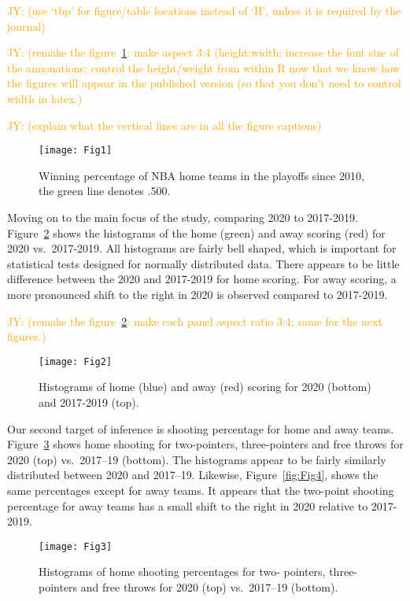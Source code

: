 \documentclass[10pt]{article}
\newcommand{\jy}[1]{\textcolor{orange}{JY: (#1)}}
\begin{document}
\jy{use `tbp' for figure/table locations instead of `H', unless it is
  required by the journal}

\jy{remake the figure~\ref{fig:Fig1}: make aspect 3:4 (height:width;
  increase the font size of the annonations; control the height/weight
  from within R now that we know how the figures will appear in the
  published version (so that you don't need to control width in latex.}

\jy{explain what the vertical lines are in all the figure captions}

\begin{figure}[tbp]
  \centering
  \texttt{[image: Fig1]}
  \caption{Winning percentage of NBA home teams in the playoffs since
    2010, the green line denotes .500.}
  \label{fig:Fig1}
\end{figure}

Moving on to the main focus of the study, comparing 2020 to 2017-2019.
Figure~\ref{fig:Fig2} shows the histograms of the home (green) and
away scoring (red) for 2020 vs.~2017-2019. All histograms are
fairly bell shaped, which is important for statistical tests
designed for normally distributed data. There appears to be little
difference between the 2020 and 2017-2019 for home scoring. For
away scoring, a more pronounced shift to the right in 2020 is observed
compared to 2017-2019.


\jy{remake the figure~\ref{fig:Fig2}: make each panel aspect ratio 3:4; same for the
  next figures.}

\begin{figure}[H]
  \centering
  \texttt{[image: Fig2]}
  \caption{Histograms of home (blue) and away (red) scoring
    for 2020 (bottom) and 2017-2019 (top).}
  \label{fig:Fig2}
\end{figure}

Our second target of inference is shooting percentage for home and away teams.
Figure~\ref{fig:Fig3} shows home shooting for two-pointers, three-pointers and
free throws for 2020 (top) vs.~2017--19 (bottom). The histograms appear to be fairly
similarly distributed between 2020 and 2017--19. Likewise, Figure~\ref{fig:Fig4},
shows the same percentages except for away teams. It appears that the
two-point shooting percentage for away teams has a small shift to the
right in 2020 relative to 2017-2019.




\begin{figure}[H]
  \centering
  \texttt{[image: Fig3]}
  \caption{Histograms of home shooting percentages for two-
    pointers, three-pointers and free throws for 2020 (top) vs.~2017--19
    (bottom).}
  \label{fig:Fig3}
\end{figure}
\end{document}
